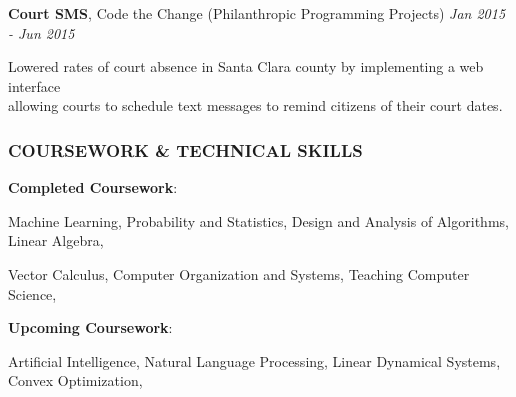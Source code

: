 \documentclass[11pt,letterpaper]{article}%
\begin{document}
\vspace{-.3em}
\hspace{.6em}  
{\bf Court SMS}, Code the Change (Philanthropic Programming Projects) \hfill \textit{Jan 2015 - Jun 2015}
\vspace{-.6em}
\begin{itemize*}
\item Lowered rates of court absence in Santa Clara county by implementing a web interface \\allowing courts to schedule text messages to remind citizens of their court dates.
\end{itemize*}


\vspace{-1em}
\hrulefill 
\subsubsection*{COURSEWORK \& TECHNICAL SKILLS}
\vspace{-1ex}
\hrulefill

\hspace{.6em} 
{\bf Completed Coursework}: 

\hspace{2.4em}
Machine Learning,
Probability and Statistics, 
Design and Analysis of Algorithms, 
Linear Algebra,

\hspace{2.4em}
Vector Calculus,
Computer Organization and Systems, 
Teaching Computer Science,

\hspace{.6em}
{\bf Upcoming Coursework}:

\hspace{2.4em}
Artificial Intelligence, 
Natural Language Processing,
Linear Dynamical Systems,
Convex Optimization,
\end{document}

